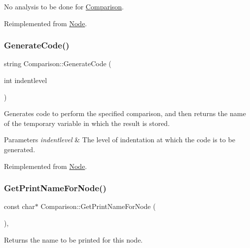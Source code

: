 No analysis to be done for \hyperlink{class_comparison}{Comparison}. 

Reimplemented from \hyperlink{class_node_a5f88d55c6f253a29def7ccc443d83d47}{Node}.

\mbox{\label{class_comparison_a7f806a596494ef371aea077da8050ce4}} 
\subsubsection{\texorpdfstring{Generate\+Code()}{GenerateCode()}}
{\footnotesize\ttfamily string Comparison\+::\+Generate\+Code (\begin{DoxyParamCaption}\item[{int}]{indentlevel }\end{DoxyParamCaption})\hspace{0.3cm}{\ttfamily [virtual]}}

Generates code to perform the specified comparison, and then returns the name of the temporary variable in which the result is stored. 
\begin{DoxyParams}{Parameters}
{\em indentlevel} & The level of indentation at which the code is to be generated. \\
\hline
\end{DoxyParams}


Reimplemented from \hyperlink{class_node_acb60e526730e8436056375a3055c2c32}{Node}.

\mbox{\label{class_comparison_ae861c70b6cd3696f029139ca8751e8bc}} 
\subsubsection{\texorpdfstring{Get\+Print\+Name\+For\+Node()}{GetPrintNameForNode()}}
{\footnotesize\ttfamily const char$\ast$ Comparison\+::\+Get\+Print\+Name\+For\+Node (\begin{DoxyParamCaption}{ }\end{DoxyParamCaption})\hspace{0.3cm}{\ttfamily [inline]}, {\ttfamily [virtual]}}

Returns the name to be printed for this node. 

